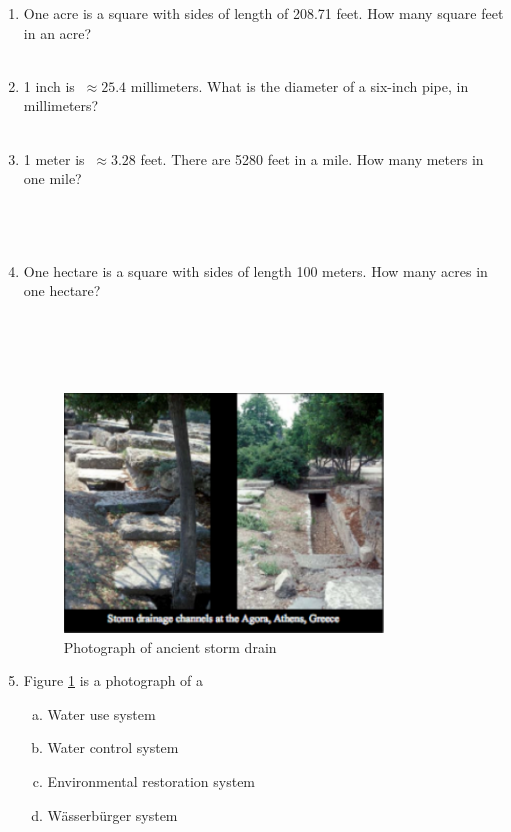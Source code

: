 \documentclass[11pt]{article}
\begin{document}


\begin{enumerate}
\item One acre is a square with sides of length of 208.71 feet.  How many square feet in an acre?
~\\
~\\
\item 1 inch is $~\approx 25.4$ millimeters.  What is the diameter of a six-inch pipe, in millimeters?
~\\
~\\
\item 1 meter is $~\approx 3.28$ feet.   There are 5280 feet in a mile.   How many meters in one mile?
~\\
~\\
~\\
~\\
\item One hectare is a square with sides of length 100 meters.  How many acres in one hectare?
~\\
~\\
~\\
~\\
~\\
\begin{figure}[h!] %
   \centering
   \includegraphics[height=2.5in]{greek-storm-drain.pdf} 
   \caption{Photograph of ancient storm drain}
   \label{fig:greek-storm-drain}
\end{figure}
\item Figure \ref{fig:greek-storm-drain} is a photograph of a
\begin{enumerate}[(a)]
\item Water use system
\item Water control system
\item Environmental restoration system
\item W{\"a}sserb{\"u}rger system
\end{enumerate}


\end{enumerate}
\end{document}
